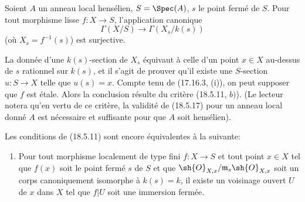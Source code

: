 \begin{theorem}[18.5.17]
\label{IV.18.5.17}
Soient $A$ un anneau local hensélien, $S=\Spec(A)$, $s$ le point fermé de $S$. Pour tout morphisme lisse $f:X\to S$, l'application canonique
\[
  \Gamma(X/S)\longrightarrow\Gamma(X_s/k(s))
\]
(où $X_s=f^{-1}(s)$) est surjective.
\end{theorem}

La donnée d'une $k(s)$-section de $X_s$ équivaut à celle d'un point $x\in X$ au-dessus de $s$ rationnel sur $k(s)$, et il s'agit de prouver qu'il existe une $S$-section $u:S\to X$ telle que $u(s)=x$. Compte tenu de (17.16.3, (i)), on peut supposer que $f$ est étale. Alors la conclusion résulte du critère (18.5.11, $b)$). (Le lecteur notera qu'en vertu de ce critère, la validité de (18.5.17) pour un anneau local donné $A$ est nécessaire et suffisante pour que $A$ soit hensélien).

\begin{remark}[18.5.18]
\label{IV.18.5.18}
Les conditions de (18.5.11) sont encore équivalentes à la suivante:
\begin{enumerate}
  \item[d)] Pour tout morphisme localement de type fini $f:X\to S$ et tout point $x\in X$ tel que $f(x)$ soit le point fermé $s$ de $S$ et que $\sh{O}_{X,x}/\mathfrak m_s\sh{O}_{X,x}$ soit un corps canoniquement isomorphe à $k(s)=k$, il existe un voisinage ouvert $U$ de $x$ dans $X$ tel que $f|U$ soit une immersion fermée.
\end{enumerate}
\end{remark}


